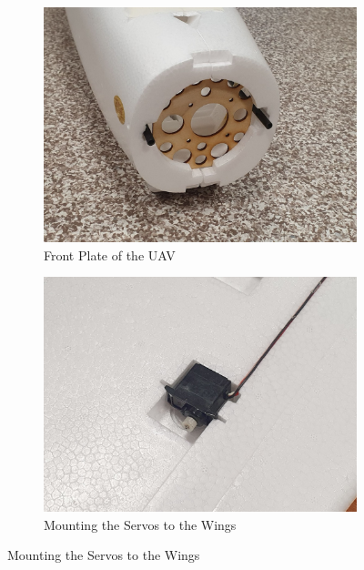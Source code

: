 \documentclass[12pt]{article}
\begin{document}
\begin{figure}
     \centering
     \begin{subfigure}{0.4\textwidth}
     \centering
        \vfill
        \includegraphics[width=\textwidth]{front_plate.jpg}
         \caption{Front Plate of the UAV}
       \end{subfigure}
     \hspace{2 pt}
     \begin{subfigure}{0.4\textwidth}
         \centering
         \includegraphics[width=\textwidth]{unnamed (17).jpg}
        \caption{Mounting the Servos to the Wings}
     \end{subfigure}
    \label{fig:three graphs}
\end{figure}
\end{document}
